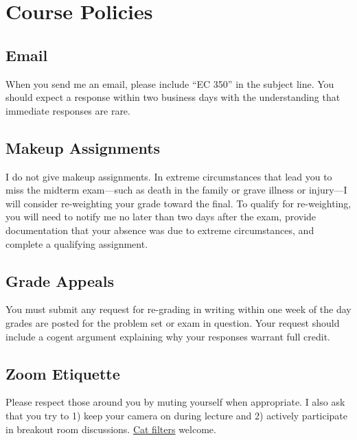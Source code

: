 \documentclass[11pt]{article}
\begin{document}
\newpage

\section*{Course Policies}

\subsection*{Email} 

When you send me an email, please include ``EC 350'' in the subject line. You should expect a response within two business days with the understanding that immediate responses are rare. 

\subsection*{Makeup Assignments} 

I do not give makeup assignments. In extreme circumstances that lead you to miss the midterm exam---such as death in the family or grave illness or injury---I will consider re-weighting your grade toward the final. To qualify for re-weighting, you will need to notify me no later than two days after the exam, provide documentation that your absence was due to extreme circumstances, and complete a qualifying assignment.

\subsection*{Grade Appeals} 

You must submit any request for re-grading in writing within one week of the day grades are posted for the problem set or exam in question. Your request should include a cogent argument explaining why your responses warrant full credit.

\subsection*{Zoom Etiquette} 

Please respect those around you by muting yourself when appropriate. I also ask that you try to 1) keep your camera on during lecture and 2) actively participate in breakout room discussions. \href{https://www.youtube.com/watch?v=TDNP-SWgn2w}{Cat filters} welcome. 

\end{document}
